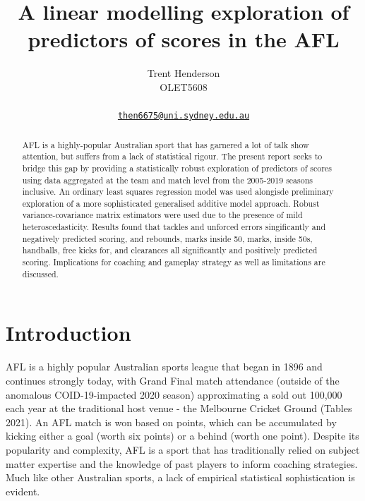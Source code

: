 \documentclass{article}
\title{A linear modelling exploration of predictors of scores in the AFL}
\author{
    Trent Henderson
   \\
    OLET5608 \\
   \\
  \texttt{\href{mailto:then6675@uni.sydney.edu.au}{\nolinkurl{then6675@uni.sydney.edu.au}}} \\
  }
\begin{document}
\maketitle

\def\tightlist{}


\begin{abstract}
AFL is a highly-popular Australian sport that has garnered a lot of talk show attention, but suffers from a lack of statistical rigour. The present report seeks to bridge this gap by providing a statistically robust exploration of predictors of scores using data aggregated at the team and match level from the 2005-2019 seasons inclusive. An ordinary least squares regression model was used alongisde preliminary exploration of a more sophisticated generalised additive model approach. Robust variance-covariance matrix estimators were used due to the presence of mild heteroscedasticity. Results found that tackles and unforced errors singificantly and negatively predicted scoring, and rebounds, marks inside 50, marks, inside 50s, handballs, free kicks for, and clearances all significantly and positively predicted scoring. Implications for coaching and gameplay strategy as well as limitations are discussed.
\end{abstract}


\hypertarget{introduction}{%
\section{Introduction}\label{introduction}}

AFL is a highly popular Australian sports league that began in 1896 and continues strongly today, with Grand Final match attendance (outside of the anomalous COID-19-impacted 2020 season) approximating a sold out 100,000 each year at the traditional host venue - the Melbourne Cricket Ground (Tables 2021). An AFL match is won based on points, which can be accumulated by kicking either a goal (worth six points) or a behind (worth one point). Despite its popularity and complexity, AFL is a sport that has traditionally relied on subject matter expertise and the knowledge of past players to inform coaching strategies. Much like other Australian sports, a lack of empirical statistical sophistication is evident.
\end{document}
